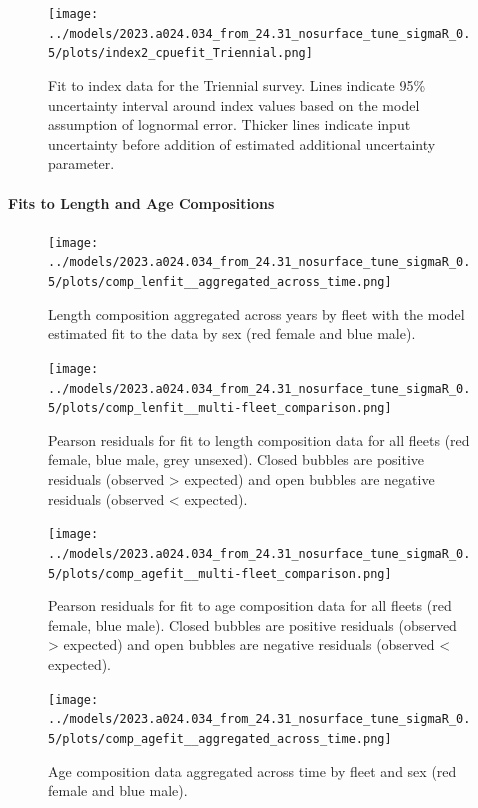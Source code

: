 \documentclass[11pt,
  english,
  letterpaper,
]{article}
\begin{document}
\begin{figure}
\centering
\texttt{[image: ../models/2023.a024.034\_from\_24.31\_nosurface\_tune\_sigmaR\_0.5/plots/index2\_cpuefit\_Triennial.png]}
\caption{Fit to index data for the Triennial survey. Lines indicate 95\% uncertainty interval around index values based on the model assumption of lognormal error. Thicker lines indicate input uncertainty before addition of estimated additional uncertainty parameter.\label{fig:index-tri-fit}}
\end{figure}

\hypertarget{fits-to-length-and-age-compositions}{%
\paragraph{Fits to Length and Age Compositions}\label{fits-to-length-and-age-compositions}}

\begin{figure}
\centering
\texttt{[image: ../models/2023.a024.034\_from\_24.31\_nosurface\_tune\_sigmaR\_0.5/plots/comp\_lenfit\_\_aggregated\_across\_time.png]}
\caption{Length composition aggregated across years by fleet with the model estimated fit to the data by sex (red female and blue male).\label{fig:len-agg-fit}}
\end{figure}

\begin{figure}
\centering
\texttt{[image: ../models/2023.a024.034\_from\_24.31\_nosurface\_tune\_sigmaR\_0.5/plots/comp\_lenfit\_\_multi-fleet\_comparison.png]}
\caption{Pearson residuals for fit to length composition data for all fleets (red female, blue male, grey unsexed). Closed bubbles are positive residuals (observed \textgreater{} expected) and open bubbles are negative residuals (observed \textless{} expected).\label{fig:len-all-pearson}}
\end{figure}

\begin{figure}
\centering
\texttt{[image: ../models/2023.a024.034\_from\_24.31\_nosurface\_tune\_sigmaR\_0.5/plots/comp\_agefit\_\_multi-fleet\_comparison.png]}
\caption{Pearson residuals for fit to age composition data for all fleets (red female, blue male). Closed bubbles are positive residuals (observed \textgreater{} expected) and open bubbles are negative residuals (observed \textless{} expected).\label{fig:age-all-pearson}}
\end{figure}

\begin{figure}
\centering
\texttt{[image: ../models/2023.a024.034\_from\_24.31\_nosurface\_tune\_sigmaR\_0.5/plots/comp\_agefit\_\_aggregated\_across\_time.png]}
\caption{Age composition data aggregated across time by fleet and sex (red female and blue male).\label{fig:agg-marg-age-fit}}
\end{figure}
\end{document}
